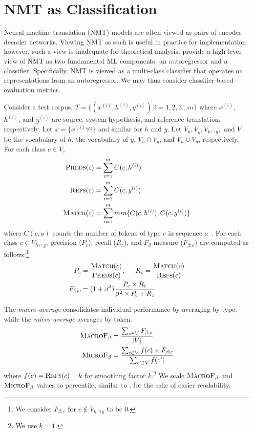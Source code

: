\section{NMT as Classification}
\label{sec:mt-as-cls}
Neural machine translation (NMT) models are often viewed as pairs of encoder-decoder networks.
Viewing NMT as such is useful in practice for implementation; however, such a view is inadequate for theoretical analysis. %
\citet{gowda2020finding} provide a high-level view of NMT as two fundamental ML components: an autoregressor and a classifier. 
Specifically, NMT is viewed as a multi-class classifier that operates on representations from an autoregressor.
We may thus consider classifier-based evaluation metrics.


Consider a test corpus, $T = \{ (x^{(i)}, h^{(i)}, y^{(i)}) | i = 1,2,3...m \}$ where $x^{(i)}$, $h^{(i)}$, and $y^{(i)}$ are source, system hypothesis, and reference translation, respectively. Let $x = \{x^{(i)} \forall i\}$ and similar for $h$ and $y$.  Let $V_h, V_y, V_{h\cap y},$ and $V$ be the vocabulary of $h$, the vocabulary of $y$, $V_h \cap V_y$, and $V_h \cup V_y$, respectively.
For each class $c \in V$, 
\begin{align*}
 \textsc{Preds}(c) &= \sum_{i=1}^m C(c, h^{(i)})\\
 \textsc{Refs}(c) &= \sum_{i=1}^m C(c, y^{(i)})\\
\textsc{Match}(c) &= \sum_{i=1}^m min\{C(c, h^{(i)}), C(c, y^{(i)})\} 
\end{align*}
\noindent where $C(c, a)$  counts the number of tokens of type $c$ in sequence $a$~\cite{papineni-etal-2002-bleu}. 
For each class $c \in V_{h \cap y}$, precision ($P_c$), recall ($R_c$), and $F_\beta$ measure ($F_{\beta;c}$) are computed as follows:\footnote{We consider $F_{\beta;c}$ for $c \not\in V_{h \cap y}$ to be 0.}
\begin{align*}
    P_c &= \frac{\textsc{Match}(c)}{\textsc{Preds}(c)} ; \hspace{5mm} R_c = \frac{\textsc{Match}(c)}{\textsc{Refs}(c)} \\
    F_{\beta;c} &= (1 + \beta^2)  \frac{ P_c \times R_c}{ \beta^2 \times P_c + R_c}
\end{align*}

The \textit{macro-average} consolidates individual performance by averaging by type, while the  \textit{micro-average} averages by token:  
\begin{align*}
\textsc{MacroF}{\text{$_{{\beta}}$}} &= \frac{\sum_{c \in V} F_{\beta;c}} {|V|}\\
\textsc{MicroF}{\text{$_{{\beta}}$}} &= \frac{\sum_{c\in V} f(c) \times F_{\beta;c}} {\sum_{c'\in V} f(c')}
\end{align*}
\noindent where $f(c) = \textsc{Refs}(c)+k$ for smoothing factor $k$.\footnote{We use $k=1$.} We scale $\textsc{MacroF}{\text{$_{{\beta}}$}}$ and $\textsc{MicroF}{\text{$_{{\beta}}$}}$ values to percentile, similar to \bleu, for the sake of easier readability. 
